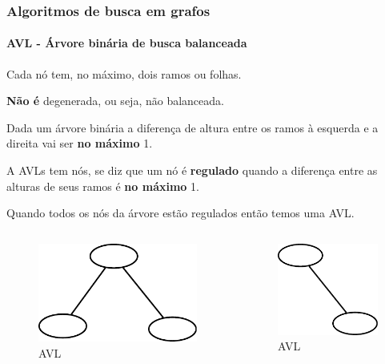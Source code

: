 \begin{frame}
	\frametitle{Algoritmos de busca em grafos}
	\framesubtitle{AVL - Árvore binária de busca balanceada}
	\par Cada nó tem, no máximo, dois ramos ou folhas.
	\par \textbf{Não é} degenerada, ou seja, não balanceada.
	\par Dada um árvore binária a diferença de altura entre os ramos à esquerda e a direita vai ser \textbf{no máximo} 1.
	\par A AVLs tem nós, se diz que um nó é \textbf{regulado} quando a diferença entre as alturas de seus ramos é \textbf{no máximo} 1.
	\par Quando todos os nós da árvore estão regulados então temos uma AVL.
	\begin{columns}
		\begin{column}{0.33\textwidth}
			\begin{figure}
				\centering
				\includegraphics[width=.7\linewidth]{images/AVL0}
				\caption{AVL}
				\label{fig:avl0}
			\end{figure}
		\end{column}
		\begin{column}{0.33\textwidth}
			\begin{figure}
				\centering
				\includegraphics[width=.4\linewidth]{images/AVL1}
				\caption{AVL}
				\label{fig:avl1}
			\end{figure}
		\end{column}

\end{columns}
\end{frame}
